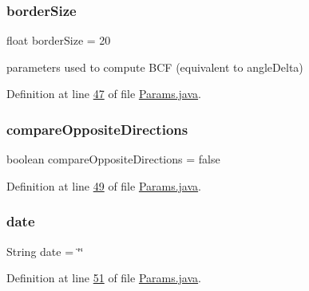 \subsubsection{\texorpdfstring{border\+Size}{borderSize}}
{\footnotesize\ttfamily float border\+Size = 20\hspace{0.3cm}{\ttfamily [static]}}

parameters used to compute B\+CF (equivalent to angle\+Delta) 

Definition at line \hyperlink{_params_8java_source_l00047}{47} of file \hyperlink{_params_8java_source}{Params.\+java}.

\hypertarget{classdata_1_1_params_a8c0dba3f8308ea1257549b3cef11ea23}{}\label{classdata_1_1_params_a8c0dba3f8308ea1257549b3cef11ea23} 
\subsubsection{\texorpdfstring{compare\+Opposite\+Directions}{compareOppositeDirections}}
{\footnotesize\ttfamily boolean compare\+Opposite\+Directions = false\hspace{0.3cm}{\ttfamily [static]}}



Definition at line \hyperlink{_params_8java_source_l00049}{49} of file \hyperlink{_params_8java_source}{Params.\+java}.

\hypertarget{classdata_1_1_params_aecbab8174a6d72649883508cf9940d58}{}\label{classdata_1_1_params_aecbab8174a6d72649883508cf9940d58} 
\subsubsection{\texorpdfstring{date}{date}}
{\footnotesize\ttfamily String date = \char`\"{}\char`\"{}\hspace{0.3cm}{\ttfamily [static]}}



Definition at line \hyperlink{_params_8java_source_l00051}{51} of file \hyperlink{_params_8java_source}{Params.\+java}.

\hypertarget{classdata_1_1_params_a3e846fb606e7abcd1e78bebb5292e4c2}{}\label{classdata_1_1_params_a3e846fb606e7abcd1e78bebb5292e4c2} 
